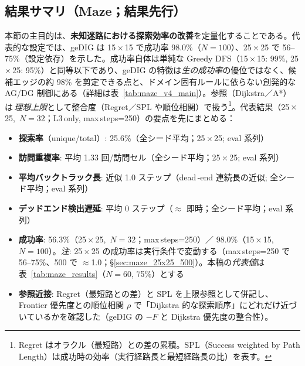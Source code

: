 \documentclass[ja=standard,xelatex]{bxjsarticle}
\begin{document}
\subsection*{結果サマリ（Maze；結果先行）}
\label{sec:maze_result_summary}
本節の主目的は、\textbf{未知迷路における探索効率の改善}を定量化することである。代表的な設定では、geDIG は 15\,\mbox{$\times$}\,15 で成功率 98.0\%（$N{=}100$）、25\,\mbox{$\times$}\,25 で 56--75\%（設定依存）を示した。成功率自体は単純な Greedy DFS（15\,\mbox{$\times$}\,15: 99\%, 25\,\mbox{$\times$}\,25: 95\%）と同等以下であり、geDIG の特徴は\emph{生の成功率}の優位ではなく、候補エッジの約 98\% を剪定できる点と、ドメイン固有ルールに依らない創発的な AG/DG 制御にある（詳細は表~\ref{tab:maze_v4_main}）。参照（Dijkstra／A*）は\,\emph{理想上限}として整合度（Regret／SPL や順位相関）で扱う\footnote{Regret はオラクル（最短路）との差の累積。SPL（Success weighted by Path Length）は成功時の効率（実行経路長と最短経路長の比）を表す。}。代表結果（25\,\mbox{$\times$}\,25, \,$N{=}32$；L3\,only, max\,steps=250）の要点を先にまとめる：
\begin{itemize}[leftmargin=1.4em]
  \item \textbf{探索率}（unique/total）: 25.6\%（全シード平均；25\,\mbox{$\times$}\,25; eval 系列）
  \item \textbf{訪問重複率}: 平均 1.33 回/訪問セル（全シード平均；25\,\mbox{$\times$}\,25; eval 系列）
  \item \textbf{平均バックトラック長}: 近似 1.0 ステップ（dead\,\mbox{-}end 連続長の近似; 全シード平均；eval 系列）
  \item \textbf{デッドエンド検出遅延}: 平均 0 ステップ（$\approx$ 即時；全シード平均；eval 系列）
  \item \textbf{成功率}: 56.3\%（25\,\mbox{$\times$}\,25, \,$N{=}32$；max\,steps=250）／ 98.0\%（15\,\mbox{$\times$}\,15, \,$N{=}100$）。\textit{注}: 25\,\mbox{$\times$}\,25 の成功率は実行条件で変動する（max\,steps=250 で 56--75\%、500 で $\approx$1.0；\S\ref{sec:maze_25x25_500}）。本稿の\emph{代表値}は表~\ref{tab:maze_results}（$N{=}60$, 75\%）とする
  \item \textbf{参照近接}: Regret（最短路との差）と SPL を上限参照として併記し、Frontier 優先度との順位相関 $\rho$ で「Dijkstra 的な探索順序」にどれだけ近づいているかを確認した（geDIG の $-F$ と Dijkstra 優先度の整合性）。
\end{itemize}
\end{document}
